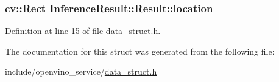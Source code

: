 \subsubsection[{\texorpdfstring{location}{location}}]{\setlength{\rightskip}{0pt plus 5cm}cv\+::\+Rect Inference\+Result\+::\+Result\+::location}\hypertarget{structInferenceResult_1_1Result_a20260cebf785b75132140ab517594660}{}\label{structInferenceResult_1_1Result_a20260cebf785b75132140ab517594660}


Definition at line 15 of file data\+\_\+struct.\+h.



The documentation for this struct was generated from the following file\+:\begin{DoxyCompactItemize}
\item 
include/openvino\+\_\+service/\hyperlink{data__struct_8h}{data\+\_\+struct.\+h}\end{DoxyCompactItemize}
